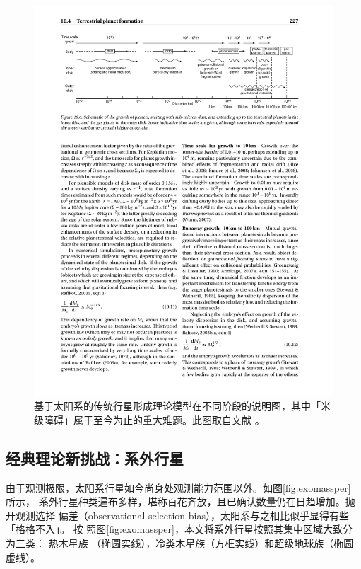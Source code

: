 \begin{figure}[h!]
\centering
\includegraphics[width=1.0\textwidth]{figures/chapter1/fig12_pfsequence.pdf}
\caption[基于太阳系的传统行星形成理论模型在不同阶段的说明图，其中「米级障碍」属于至今为止的重大难题。图片版权 Michael Perryman。]{基于太阳系的传统行星形成理论模型在不同阶段的说明图，其中「米级障碍」属于至今为止的重大难题。此图取自文献 。}
\label{fig:pfstage}
\end{figure}

\subsection{经典理论新挑战：系外行星} \label{sec: exopftheory}

由于观测极限，太阳系行星如今尚身处观测能力范围以外。如图\ref{fig:exomassper} 所示，
系外行星种类遍布多样，堪称百花齐放，且已确认数量仍在日趋增加。抛开观测选择
偏差（observational selection bias），太阳系与之相比似乎显得有些「格格不入」。 按
照图\ref{fig:exomassper}，本文将系外行星按照其集中区域大致分为三类： 热木星族
（椭圆实线），冷类木星族（方框实线）和超级地球族（椭圆虚线）。

